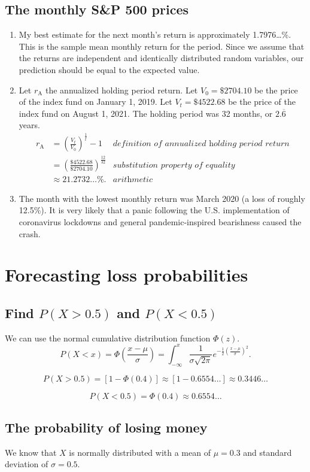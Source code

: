 \documentclass[12pt]{article}
\begin{document}
\subsection{The monthly S\&P 500 prices}
\begin{enumerate}
\item My best estimate for the next month's return is approximately 1.7976\dots\%. This is the sample mean monthly return for the period. Since we assume that the returns are independent and identically distributed random variables, our prediction should be equal to the expected value.
\item Let $r_{\mathrm{A}}$ the annualized holding period return. Let $V_0=\$2704.10$ be the price of the index fund on January 1, 2019. Let $V_t=\$4522.68$ be the price of the index fund on August 1, 2021. The holding period was 32 months, or $2.\overline{6}$ years.
\begin{align*}
r_{\mathrm{A}}
&=\left(\frac{V_t}{V_0}\right)^{\frac{1}{t}}-1&\textit{definition of annualized holding period return}\\
&=\left(\frac{\$4522.68}{\$2704.10}\right)^{\frac{12}{32}}&\textit{substitution property of equality}\\
&\approx 21.2732\dots\%.&\textit{arithmetic}
\end{align*}
\item The month with the lowest monthly return was March 2020 (a loss of roughly 12.5\%). It is very likely that a panic following the U.S. implementation of coronavirus lockdowns and general pandemic-inspired bearishness caused the crash.
\end{enumerate}
\section{Forecasting loss probabilities}
\subsection{Find $P(X>0.5)$ and $P(X<0.5)$}
We can use the normal cumulative distribution function $\Phi(z)$.
\[P(X<x)=\Phi\left(\frac{x-\mu}{\sigma}\right)=\int_{-\infty}^{x}{\frac{1}{\sigma\sqrt{2\pi}}e^{-\frac{1}{2}\left(\frac{x-\mu}{\sigma}\right)^2}}.\]

\[P(X>0.5)=[1-\Phi(0.4)]\approx [1-0.6554\dots]\approx 0.3446\dots\]

\[P(X<0.5)=\Phi(0.4)\approx 0.6554\dots\]
\subsection{The probability of losing money}
We know that $X$ is normally distributed with a mean of $\mu=0.3$ and standard deviation of $\sigma=0.5$.
\end{document}
